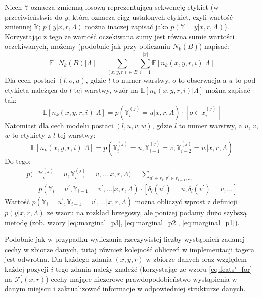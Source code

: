 \documentclass[a4paper,10]{article}
\begin{document}
Niech $\mathbb Y$ oznacza zmienną losową reprezentującą sekwencję etykiet
(w przeciwieństwie do $y$, która oznacza ciąg ustalonych etykiet, czyli
wartość zmiennej $\mathbb Y$; $p(y \vert x, r, \Lambda)$ można inaczej zapisać
jako $p(\mathbb Y=y \vert x, r, \Lambda)$).
Korzystając z tego że wartość oczekiwana sumy jest równa sumie wartości
oczekiwanych, możemy (podobnie jak przy obliczaniu $N_k(B)$) napisać:
\begin{equation}
\mathbb E \left[ N_k(B) \vert \Lambda \right] =
  \sum_{(x, y, r) \in B} \sum_{i=1}^{|x|}
  \mathbb E \left[ n_k(x, y, r, i) \vert \Lambda \right]
\end{equation}
Dla cech postaci $(l, o, u)$, gdzie $l$ to numer warstwy, $o$ to obserwacja
a $u$ to pod-etykieta należąca do $l$-tej warstwy, wzór na
$\mathbb E \left[ n_k(x, y, r, i) \vert \Lambda \right]$
można zapisać tak:
\begin{equation}
\mathbb E \left[ n_k(x, y, r, i) \vert \Lambda \right] =
  p(\mathbb Y^{(j)}_i = u \vert x, r, \Lambda) \cdot [o \in x^{(j)}_i]
\end{equation}
Natomiast dla cech modelu postaci $(l, u, v, w)$, gdzie $l$ to numer warstwy,
a $u$, $v$, $w$ to etykiety z $l$-tej warstwy:
\begin{equation}
\mathbb E \left[ n_k(x, y, r, i) \vert \Lambda \right] =
  p(\mathbb Y^{(j)}_i = u, \mathbb Y^{(j)}_{i-1} = v, \mathbb Y^{(j)}_{i-2} = w \vert x, r, \Lambda)
\end{equation}
Do tego:
\begin{align}\label{eq:marginal_p}
p(&\mathbb Y^{(j)}_i = u, \mathbb Y^{(j)}_{i-1} = v, \ldots \vert x, r, \Lambda) =
  \sum_{u^\prime \in r_i, v^\prime \in r_{i-1}, \ldots}\\
    &p(\mathbb Y_i = u^\prime, \mathbb Y_{i-1} = v^\prime, \ldots \vert x, r, \Lambda)
    \cdot [\delta_l(u^\prime) = u, \delta_l(v^\prime) = v, \ldots] \nonumber
\end{align}
Wartość $p(\mathbb Y_i = u^\prime, \mathbb Y_{i-1} = v^\prime, \ldots \vert x, r, \Lambda)$
można obliczyć wprost z definicji $p(y \vert x, r, \Lambda)$ ze wzoru na
rozkład brzegowy, ale poniżej podamy dużo szybszą metodę
(zob. wzory \ref{eq:marginal_p3}, \ref{eq:marginal_p2}, \ref{eq:marginal_p1}).

Podobnie jak w przypadku wyliczania rzeczywistej liczby wystąpnień
zadanej cechy w zbiorze danych, tutaj również kolejność obliczeń 
w implementacji tagera jest odwrotna.
Dla każdego zdania $(x, y, r)$ w zbiorze danych oraz względem każdej pozycji $i$
tego zdania należy znaleźć (korzystając ze wzoru \ref{eq:feats'_for} na 
$\mathcal F^\prime_i(x, r)$) cechy mające niezerowe prawdopodobieństwo
wystąpienia w danym miejscu i zaktualizować informacje w odpowiedniej
strukturze danych.
\end{document}
